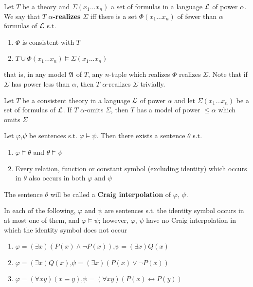 \documentclass[11pt]{article}
\begin{document}
Let \(T\) be a theory and \(\Sigma(x_1\dots x_n)\) a set of formulas in a language
\(\mathcal{L}\) of power \(\alpha\). We say that \(T\) \textbf{\(\alpha\)-realizes} \(\Sigma\) iff there
is a set \(\Phi(x_1\dots x_n)\) of fewer than \(\alpha\) formulas of \(\mathcal{L}\) s.t.
\begin{enumerate}
\item \(\Phi\) is consistent with \(T\)
\item \(T\cup\Phi(x_1\dots x_n)\models\Sigma(x_1\dots x_n)\)
\end{enumerate}


that is, in any model \(\mathfrak{A}\) of \(T\), any \(n\)-tuple which realizes \(\Phi\)
realizes \(\Sigma\).
Note that if \(\Sigma\) has power less than \(\alpha\), then \(T\) \(\alpha\)-realizes \(\Sigma\) trivially.

\begin{theorem}
Let \(T\) be a consistent theory in a language \(\mathcal{L}\) of power \(\alpha\) and let
\(\Sigma(x_1\dots x_n)\) be a set of formulas of \(\mathcal{L}\). If \(T\)
\(\alpha\)-omits \(\Sigma\), then \(T\) has a model of power \(\le\alpha\) which omits \(\Sigma\)
\end{theorem}

\begin{theorem}
Let \(\varphi\),\(\psi\) be sentences s.t. \(\varphi\models\psi\). Then there exists a
sentence \(\theta\) s.t.
\begin{enumerate}
\item \(\varphi\models\theta\) and \(\theta\models\psi\)
\item Every relation, function or constant symbol (excluding identity) which
occurs in \(\theta\) also occurs in both \(\varphi\) and \(\psi\)
\end{enumerate}
\end{theorem}

The sentence \(\theta\) will be called a \textbf{Craig interpolation} of \(\varphi\), \(\psi\).

\begin{examplle}[]
In each of the following, \(\varphi\) and \(\psi\) are sentences s.t. the identity symbol
occurs in at most one of them, and \(\varphi\models\psi\); however, \(\varphi\), \(\psi\) have
no Craig interpolation in which the identity symbol does not occur
\begin{enumerate}
\item \(\varphi=(\exists x)(P(x)\wedge\neg P(x))\),\(\psi=(\exists x)Q(x)\)
\item \(\varphi=(\exists x)Q(x)\),\(\psi=(\exists x)(P(x)\vee\neg P(x))\)
\item \(\varphi=(\forall xy)(x\equiv y)\),\(\psi=(\forall
      xy)(P(x)\leftrightarrow P(y))\)
\end{enumerate}
\end{examplle}
\end{document}
